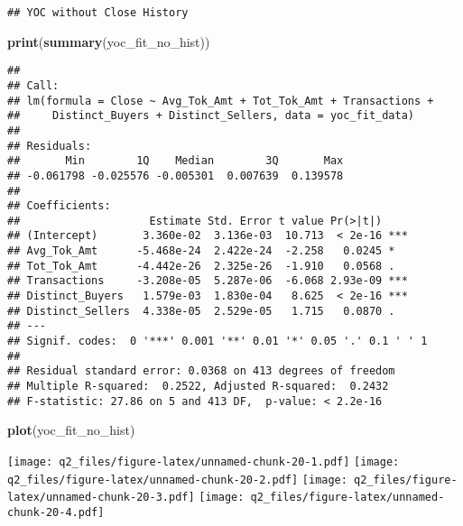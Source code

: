 \documentclass[]{article}
\newenvironment{Shaded}{\begin{snugshade}}{\end{snugshade}}
\newcommand{\KeywordTok}[1]{\textcolor[rgb]{0.13,0.29,0.53}{\textbf{#1}}}
\newcommand{\NormalTok}[1]{#1}
\begin{document}
\begin{verbatim}
## YOC without Close History
\end{verbatim}

\begin{Shaded}
\begin{Highlighting}[]
\KeywordTok{print}\NormalTok{(}\KeywordTok{summary}\NormalTok{(yoc_fit_no_hist))}
\end{Highlighting}
\end{Shaded}

\begin{verbatim}
## 
## Call:
## lm(formula = Close ~ Avg_Tok_Amt + Tot_Tok_Amt + Transactions + 
##     Distinct_Buyers + Distinct_Sellers, data = yoc_fit_data)
## 
## Residuals:
##       Min        1Q    Median        3Q       Max 
## -0.061798 -0.025576 -0.005301  0.007639  0.139578 
## 
## Coefficients:
##                    Estimate Std. Error t value Pr(>|t|)    
## (Intercept)       3.360e-02  3.136e-03  10.713  < 2e-16 ***
## Avg_Tok_Amt      -5.468e-24  2.422e-24  -2.258   0.0245 *  
## Tot_Tok_Amt      -4.442e-26  2.325e-26  -1.910   0.0568 .  
## Transactions     -3.208e-05  5.287e-06  -6.068 2.93e-09 ***
## Distinct_Buyers   1.579e-03  1.830e-04   8.625  < 2e-16 ***
## Distinct_Sellers  4.338e-05  2.529e-05   1.715   0.0870 .  
## ---
## Signif. codes:  0 '***' 0.001 '**' 0.01 '*' 0.05 '.' 0.1 ' ' 1
## 
## Residual standard error: 0.0368 on 413 degrees of freedom
## Multiple R-squared:  0.2522, Adjusted R-squared:  0.2432 
## F-statistic: 27.86 on 5 and 413 DF,  p-value: < 2.2e-16
\end{verbatim}

\begin{Shaded}
\begin{Highlighting}[]
\KeywordTok{plot}\NormalTok{(yoc_fit_no_hist)}
\end{Highlighting}
\end{Shaded}

\texttt{[image: q2\_files/figure-latex/unnamed-chunk-20-1.pdf]}
\texttt{[image: q2\_files/figure-latex/unnamed-chunk-20-2.pdf]}
\texttt{[image: q2\_files/figure-latex/unnamed-chunk-20-3.pdf]}
\texttt{[image: q2\_files/figure-latex/unnamed-chunk-20-4.pdf]}
\end{document}
